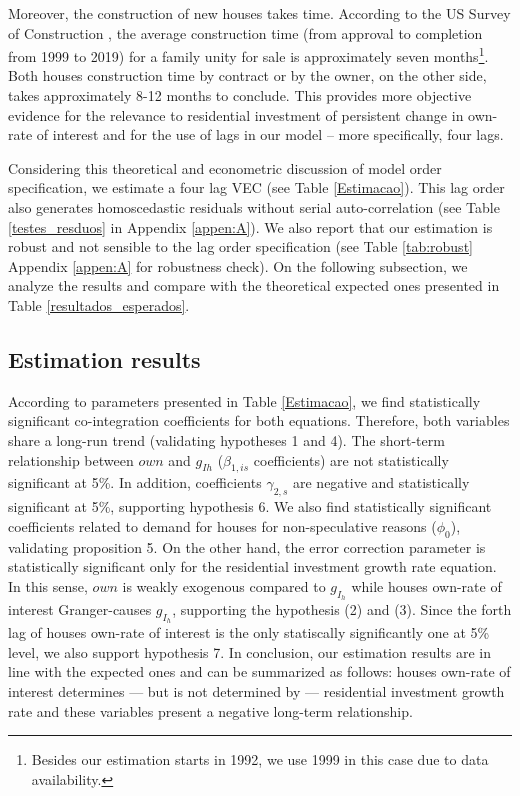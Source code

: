 \documentclass[12pt, a4paper]{article}
\begin{document}
Moreover, the construction of new houses takes time. According to the US Survey of Construction \cite{SoC_2020}, the average construction time (from approval to completion from 1999 to 2019) for a family unity for sale is approximately seven months\footnote{Besides our estimation starts in 1992, we use 1999 in this case due to data availability.}.
Both houses construction time by contract or by the owner, on the other side, takes approximately 8-12 months to conclude.
This provides more objective evidence for the relevance to residential investment of persistent change in own-rate of interest and for the use of lags in our model – more specifically, four lags.

Considering this theoretical and econometric discussion of model order specification, we estimate a four lag VEC  (see Table \ref{Estimacao}).
This lag order also generates homoscedastic residuals without serial auto-correlation (see Table \ref{testes_resduos} in Appendix \ref{appen:A}).
We also report that our estimation is robust and not sensible to the lag order specification (see Table \ref{tab:robust} Appendix \ref{appen:A} for robustness check).
On the following subsection, we analyze the results and compare with the theoretical expected ones presented in Table \ref{resultados_esperados}.


\subsection{Estimation results}
\label{sec:orgfc5663e}
\label{sec:results}

According to parameters presented in Table \ref{Estimacao}, we find statistically significant co-integration  coefficients for both equations. 
Therefore, both variables share a long-run trend (validating hypotheses 1 and 4).
The short-term relationship between \(own\) and \(g_{Ih}\) (\(\beta_{1, is}\) coefficients) are not statistically significant at 5\%.
In addition, coefficients \(\gamma_{2,s}\) are negative and statistically significant at 5\%, supporting hypothesis 6.
We also find statistically significant coefficients related to demand for houses for non-speculative reasons (\(\phi_0\)), validating proposition 5.
On the other hand, the error correction parameter is statistically significant only for the residential investment growth rate equation.
In this sense, \(own\) is weakly exogenous compared to \(g_{I_h}\) while houses own-rate of interest Granger-causes \(g_{I_h}\), supporting the hypothesis (2) and (3).
Since the forth lag of houses own-rate of interest is the only statiscally significantly one at 5\% level, we also support hypothesis 7.
In conclusion, our estimation results are in line with the expected ones and can be summarized as follows: houses own-rate of interest determines --- but is not determined by --- residential investment growth rate and these variables present a negative long-term relationship.
\end{document}
